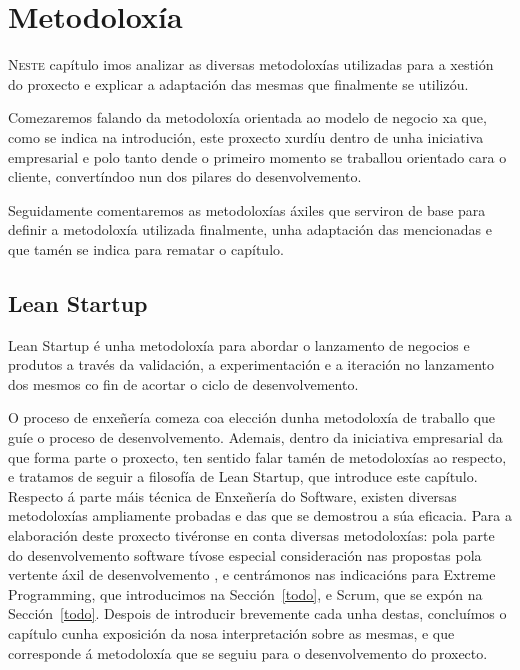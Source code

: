 \chapter{Metodoloxía}
\minitoc


  \lettrine{N}{este} capítulo imos analizar as diversas metodoloxías utilizadas para a 
xestión do proxecto e explicar a adaptación das mesmas que finalmente se utilizóu.

  Comezaremos falando da metodoloxía orientada ao modelo de negocio xa que, 
como se indica na introdución, este proxecto xurdíu dentro de unha iniciativa 
empresarial e polo tanto dende o primeiro momento se traballou orientado cara o 
cliente, convertíndoo nun dos pilares do desenvolvemento.

  Seguidamente comentaremos as metodoloxías áxiles que serviron de base para 
definir a metodoloxía utilizada finalmente, unha adaptación das mencionadas e 
que tamén se indica para rematar o capítulo.

  \section{Lean Startup}
  Lean Startup\cite{book:leanstartup} é unha metodoloxía para abordar o 
lanzamento de negocios e produtos a través da validación, a experimentación e a 
iteración no lanzamento dos mesmos co fin de acortar o ciclo de desenvolvemento.


O proceso de enxeñería comeza coa elección dunha metodoloxía de traballo que
guíe o proceso de desenvolvemento. Ademais, dentro da iniciativa empresarial da
que forma parte o proxecto, ten sentido falar tamén de metodoloxías ao respecto,
e tratamos de seguir a filosofía de Lean Startup, que introduce este capítulo.
Respecto á parte máis técnica de Enxeñería do Software, existen diversas
metodoloxías ampliamente probadas e das que se demostrou a súa eficacia. Para a
elaboración deste proxecto tivéronse en conta diversas metodoloxías: pola parte
do desenvolvemento software tívose especial consideración nas propostas pola
vertente áxil de desenvolvemento , e centrámonos nas indicacións para Extreme Programming,
que introducimos na Sección~\ref{todo}, e Scrum, que se expón na
Sección~\ref{todo}. Despois de introducir brevemente cada unha destas,
concluímos o capítulo cunha exposición da nosa interpretación sobre as mesmas, e
que corresponde á metodoloxía que se seguiu para o desenvolvemento do proxecto.

